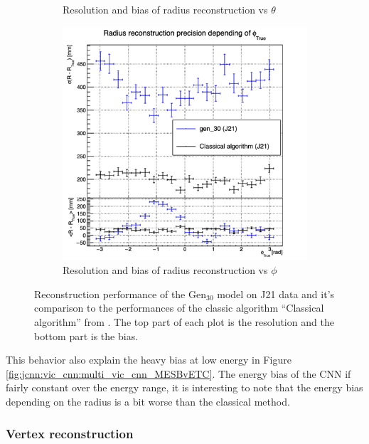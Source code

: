 \documentclass[../main.tex]{subfiles}
\begin{document}
\begin{figure}[ht]
\begin{subfigure}[t]{0.32\linewidth}
    \caption{Resolution and bias of radius reconstruction vs $\theta$}
    \label{fig:jcnn:vic_cnn:multi_vic_cnn_MSBvTTC}
  \end{subfigure}
  \begin{subfigure}[t]{0.32\linewidth}
    \centering
    \includegraphics[width=\linewidth]{images/jcnn/vic_cnn/multi_vic_cnn_MSBvPTC.png}
    \caption{Resolution and bias of radius reconstruction vs $\phi$}
    \label{fig:jcnn:vic_cnn:multi_vic_cnn_MSBvPTC}
  \end{subfigure}
  \caption{Reconstruction performance of the $\mathrm{Gen}_{30}$ model on J21 data and it's comparison to the performances of the classic algorithm ``Classical algorithm'' from \cite{lebrin_towards_2022}. The top part of each plot is the resolution and the bottom part is the bias.}
  \label{fig:jcnn:vic_cnn}
\end{figure}

This behavior also explain the heavy bias at low energy in Figure \ref{fig:jcnn:vic_cnn:multi_vic_cnn_MESBvETC}. The energy bias of the CNN if fairly constant over the energy range, it is interesting to note that the energy bias depending on the radius is a bit worse than the classical method.

\subsubsection{Vertex reconstruction}
\end{document}
